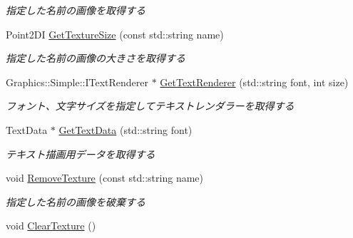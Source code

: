 \begin{DoxyCompactItemize}
\begin{DoxyCompactList}\small\item\em 指定した名前の画像を取得する \end{DoxyCompactList}\item 
Point2\+DI \hyperlink{class_graphics_manager_a42562ffd6abcab5004c37c7f0618d423}{Get\+Texture\+Size} (const std\+::string name)\hypertarget{class_graphics_manager_a42562ffd6abcab5004c37c7f0618d423}{}\label{class_graphics_manager_a42562ffd6abcab5004c37c7f0618d423}

\begin{DoxyCompactList}\small\item\em 指定した名前の画像の大きさを取得する \end{DoxyCompactList}\item 
Graphics\+::\+Simple\+::\+I\+Text\+Renderer $\ast$ \hyperlink{class_graphics_manager_a065f94529b70f799553df3072ceac127}{Get\+Text\+Renderer} (std\+::string font, int size)\hypertarget{class_graphics_manager_a065f94529b70f799553df3072ceac127}{}\label{class_graphics_manager_a065f94529b70f799553df3072ceac127}

\begin{DoxyCompactList}\small\item\em フォント、文字サイズを指定してテキストレンダラーを取得する \end{DoxyCompactList}\item 
Text\+Data $\ast$ \hyperlink{class_graphics_manager_a68d7a473286bc1fa1241c3218e8d34ba}{Get\+Text\+Data} (std\+::string font)\hypertarget{class_graphics_manager_a68d7a473286bc1fa1241c3218e8d34ba}{}\label{class_graphics_manager_a68d7a473286bc1fa1241c3218e8d34ba}

\begin{DoxyCompactList}\small\item\em テキスト描画用データを取得する \end{DoxyCompactList}\item 
void \hyperlink{class_graphics_manager_a819093e6f8ee7413de0ef25be2877f60}{Remove\+Texture} (const std\+::string name)\hypertarget{class_graphics_manager_a819093e6f8ee7413de0ef25be2877f60}{}\label{class_graphics_manager_a819093e6f8ee7413de0ef25be2877f60}

\begin{DoxyCompactList}\small\item\em 指定した名前の画像を破棄する \end{DoxyCompactList}\item 
void \hyperlink{class_graphics_manager_a0bbe7909f7987bb838adbc8c034ca175}{Clear\+Texture} ()\hypertarget{class_graphics_manager_a0bbe7909f7987bb838adbc8c034ca175}{}\label{class_graphics_manager_a0bbe7909f7987bb838adbc8c034ca175}


\end{DoxyCompactItemize}

